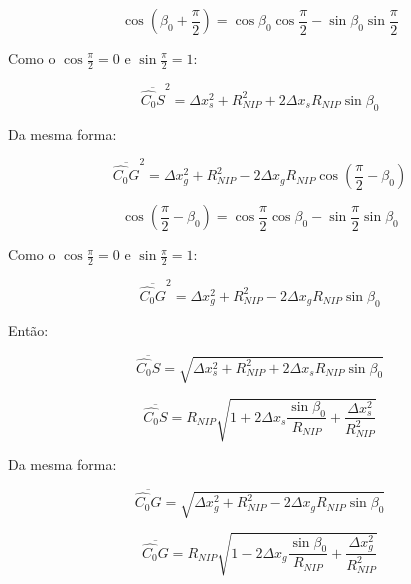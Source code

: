 \documentclass[a4paper, 12pt]{article}
\begin{document}
\begin{equation}
 \label{eq:1.11}
 \cos{\left( \beta_0 + \frac{\pi}{2} \right)} 
 = \cos{\beta_0} \cos{\frac{\pi}{2}} - \sin{\beta_0} \sin{\frac{\pi}{2}}
\end{equation}

Como o $\cos{\frac{\pi}{2}}=0$ e $\sin{\frac{\pi}{2}}=1$:

\begin{equation}
 \label{eq:1.12}
 \overline{\hat{C_0}S}^2 = \Delta x_{s}^2 + R_{NIP}^2 + 2 \Delta x_s R_{NIP} \sin{\beta_0}
\end{equation}

Da mesma forma:

\begin{equation}
 \label{eq:1.13}
 \overline{\hat{C_0}G}^2 = \Delta x_{g}^2 + R_{NIP}^2 - 2 \Delta x_g R_{NIP} 
 \cos{ \left( \frac{\pi}{2} - \beta_0 \right) }
\end{equation}

\begin{equation}
 \label{eq:1.14}
 \cos{\left( \frac{\pi}{2} - \beta_0 \right)} 
 = \cos{\frac{\pi}{2}} \cos{\beta_0} - \sin{\frac{\pi}{2}} \sin{\beta_0}
\end{equation}

Como o $\cos{\frac{\pi}{2}}=0$ e $\sin{\frac{\pi}{2}}=1$:

\begin{equation}
 \label{eq:1.15}
 \overline{\hat{C_0}G}^2 = \Delta x_{g}^2 + R_{NIP}^2 - 2 \Delta x_g R_{NIP} \sin{\beta_0}
\end{equation}

Então:

\begin{equation}
 \label{eq:1.16}
 \overline{\hat{C_0}S} = \sqrt{ \Delta x_{s}^2 + R_{NIP}^2 + 2 \Delta x_s R_{NIP} \sin{\beta_0} }
\end{equation}

\begin{equation}
 \label{eq:1.17}
 \overline{\hat{C_0}S} = 
 R_{NIP} \sqrt{  1 + 2 \Delta x_s \frac{\sin{\beta_0}}{R_{NIP}} + \frac{\Delta x_{s}^2}{R_{NIP}^2} }
\end{equation}

Da mesma forma:

\begin{equation}
 \label{eq:1.18}
 \overline{\hat{C_0}G} = \sqrt{ \Delta x_{g}^2 + R_{NIP}^2 - 2 \Delta x_g R_{NIP} \sin{\beta_0} }
\end{equation}

\begin{equation}
 \label{eq:1.19}
 \overline{\hat{C_0}G} = 
 R_{NIP} \sqrt{  1 - 2 \Delta x_g \frac{\sin{\beta_0}}{R_{NIP}} + \frac{\Delta x_{g}^2}{R_{NIP}^2} }
\end{equation}
\end{document}
